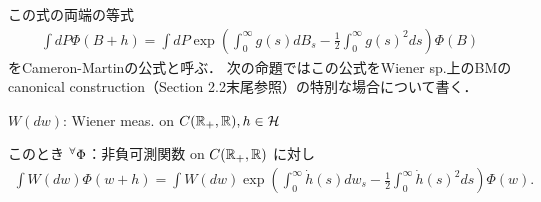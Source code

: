 \documentclass{jsarticle}
\begin{document}
この式の両端の等式
\begin{align}
    \int dP\Phi(B+h)
    = \int dP\exp\left(\int_0^\infty g(s)dB_s-\frac{1}{2}\int_0^\infty g(s)^2 ds\right)\Phi(B)
\end{align}
をCameron-Martinの公式と呼ぶ．
次の命題ではこの公式をWiener sp.上のBMのcanonical construction（Section 2.2末尾参照）の特別な場合について書く．

\begin{screen}
    \begin{prop}
    \label{thm:524}
        $W(dw)$: Wiener meas. on $C(\mathbb{R}_+,\mathbb{R}), h\in\mathcal{H}$

        このとき ${}^{\forall} \Phi$：非負可測関数 on $C(\mathbb{R}_+,\mathbb{R})$ に対し
        \begin{align}
            \int W(dw)\Phi(w+h)
            = \int W(dw)\exp\left(\int_0^\infty \dot{h}(s)dw_s-\frac{1}{2}\int_0^\infty \dot{h}(s)^2 ds\right)\Phi(w).
        \end{align}
    \end{prop}  
\end{screen}
\end{document}
